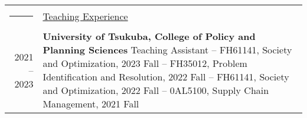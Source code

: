 \documentclass[11pt]{article}
\newcommand{\headingfont}{\LARGE \MakeUppercase }
\newenvironment{SectionTable}[1]{
	\renewcommand*{\arraystretch}{1.0}
	\setlength{\tabcolsep}{10pt}
	\begin{longtable}{Rp{5.7in}} 
		\rule{2.5cm}{4pt} 
		& \underline{#1} \\ %
	}
	{
	\end{longtable}\vspace{-.3cm}
}
\begin{document}

\begin{SectionTable}{\headingfont Teaching Experience} %

	2021 -- 2023 & 
	\textbf{University of Tsukuba, College of Policy and Planning Sciences} \newline
	 Teaching Assistant \newline
	-- FH61141, Society and Optimization, 2023 Fall \newline
	-- FH35012, Problem Identification and Resolution, 2022 Fall \newline
	-- FH61141, Society and Optimization, 2022 Fall \newline
	-- 0AL5100, Supply Chain Management, 2021 Fall \\
	
%


\end{SectionTable}
\end{document}

